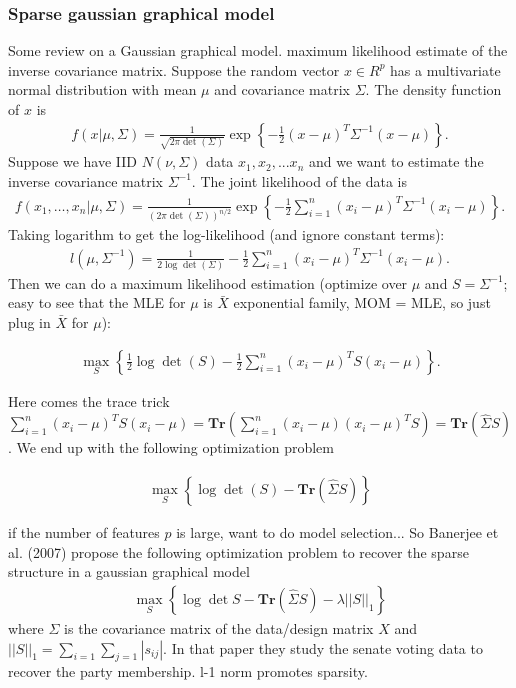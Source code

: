 \documentclass[11pt]{article}
\newcommand{\1}[1]{{\mathbf 1}\left\{#1\right\}}        %
\def\lp{\left(}
\def\rp{\right)}
\begin{document}
\subsubsection{Sparse gaussian graphical model}
Some review on a Gaussian graphical model. maximum likelihood estimate of the inverse covariance matrix. 
Suppose the random vector $x\in R^p$ has a multivariate normal distribution with mean $\mu$ and covariance matrix $\Sigma$. The density function of $x$ is
\begin{align}
\label{eq: normalPDF}
f(x|\mu,\Sigma) = \frac{1}{\sqrt{2\pi \det\lp \Sigma\rp}}\exp \left\{ -\frac{1}{2} (x-\mu)^T \Sigma^{-1}(x-\mu) \right\}.
\end{align}
Suppose we have IID $N(\nu,\Sigma)$ data $x_1,x_2,...x_n$ and we want to estimate the inverse covariance matrix $\Sigma^{-1}$. The joint likelihood of the data is
\begin{align}
\label{eq: like}
f(x_1, \dots, x_n|\mu,\Sigma) = \frac{1}{(2\pi \det\lp \Sigma\rp)^{n/2}}\exp\left\{ -\frac{1}{2} \sum_{i=1}^n(x_i-\mu)^T\Sigma^{-1}(x_i-\mu) \right\}.
\end{align}
Taking logarithm to get the log-likelihood (and ignore constant terms):
\begin{align}
\label{eq: loglike}
l(\mu,\Sigma^{-1}) = \frac{1}{2\log \det \lp \Sigma \rp}  -\frac{1}{2} \sum_{i=1}^n(x_i-\mu)^T\Sigma^{-1}(x_i-\mu).
\end{align}
Then we can do a maximum likelihood estimation (optimize over $\mu$ and $S = \Sigma^{-1}$; easy to see that the MLE for $\mu$ is $\bar{X}$ exponential family, MOM = MLE, so just plug in $\bar{X}$ for $\mu$):

\begin{align}
\label{eq: loglike}
\max_S\left\{  \frac{1}{2}\log \det\lp S \rp  -\frac{1}{2} \sum_{i=1}^n(x_i-\mu)^T S (x_i-\mu)\right\}. 
\end{align}

Here comes the trace trick $\sum_{i=1}^n(x_i-\mu)^T S (x_i-\mu) = \textbf{Tr} (\sum_{i=1}^n (x_i-\mu)(x_i-\mu)^TS) = \textbf{Tr}(\hat{\Sigma}S)$. We end up with the following optimization problem

\begin{align}
\label{eq:mle}
\max_S \left\{  \log \det \lp S\rp - \textbf{Tr}\lp \hat{\Sigma}S \rp  \right\}
\end{align}

if the number of features $p$ is large, want to do model selection... So Banerjee et al. (2007) propose the following optimization problem to recover the sparse structure in a gaussian graphical model
\begin{align}
\label{eq:gLasso}
\max_S \left\{ \log \det S - \textbf{Tr} \lp \hat{\Sigma}S \rp - \lambda ||S||_1 \right\}
\end{align}
where $\Sigma$ is the covariance matrix of the data/design matrix $X$ and $||S||_1 = \sum_{i=1}\sum_{j=1} |s_{ij}|$. In that paper they study the senate voting data to recover the party membership. l-1 norm promotes sparsity. 
\end{document}
